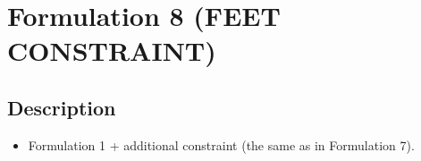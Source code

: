 \section{Formulation 8 (FEET CONSTRAINT)}\label{sec.form08}


\subsection{Description}
\begin{itemize}
    \item Formulation 1 + additional constraint (the same as in Formulation 7).
\end{itemize}


